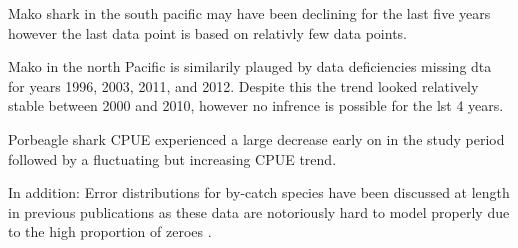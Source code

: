Mako shark in the south pacific may have been declining for the last five years however the last data point is based on relativly few data points. 

Mako in the north Pacific is similarily plauged by data deficiencies missing dta for years 1996, 2003, 2011, and 2012. Despite this the trend looked relatively stable between 2000 and 2010, however no infrence is possible for the lst 4 years.

Porbeagle shark CPUE experienced a large decrease early on in the study period followed by a fluctuating but increasing CPUE trend.

In addition: Error distributions for by-catch species have been discussed at length in previous publications as these data are notoriously hard to model properly due to the high proportion of zeroes \citep{...}. 

